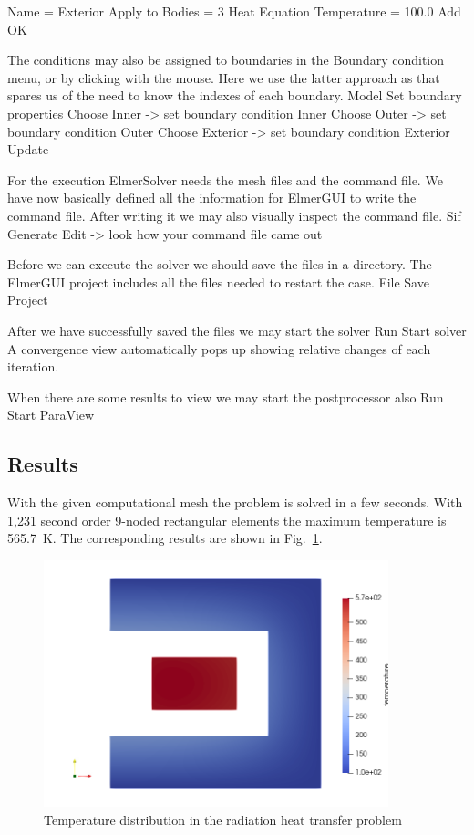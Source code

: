     Name = Exterior
    Apply to Bodies = 3
    Heat Equation
      Temperature = 100.0
    Add 
    OK
\ttend   

The conditions may also be assigned to boundaries in the Boundary condition menu, or 
by clicking with the mouse. Here we use the latter approach as that spares us of the 
need to know the indexes of each boundary.
\ttbegin
Model
  Set boundary properties
   Choose Inner -> set boundary condition Inner
   Choose Outer -> set boundary condition Outer
   Choose Exterior -> set boundary condition Exterior
  Update
\ttend


For the execution ElmerSolver needs the mesh files and the command file. 
We have now basically defined all the information for ElmerGUI to write the 
command file. After writing it we may also visually inspect the command file.
\ttbegin
Sif 
  Generate
  Edit -> look how your command file came out  
\ttend

Before we can execute the solver we should save the files in a directory. 
The ElmerGUI project includes all the files needed to restart the case.
\ttbegin
File 
  Save Project
\ttend

After we have successfully saved the files we may start the solver
\ttbegin
Run
  Start solver
\ttend
A convergence view automatically pops up showing relative changes of each iteration.

When there are some results to view we may start the postprocessor also
\ttbegin
Run
  Start ParaView
\ttend

\subsection*{Results}

With the given computational mesh the problem is solved in 
a few seconds. With 1,231 second order 9-noded
rectangular elements the maximum temperature is 565.7~K.
The corresponding results are shown in Fig.~\ref{fig:temp_rad1}.

\begin{figure}
\begin{center}
  \includegraphics[width=100mm]{temp_rad1}
\end{center}
\caption{Temperature distribution in the radiation heat transfer
problem}
\label{fig:temp_rad1}
\end{figure}
 



\hfill
